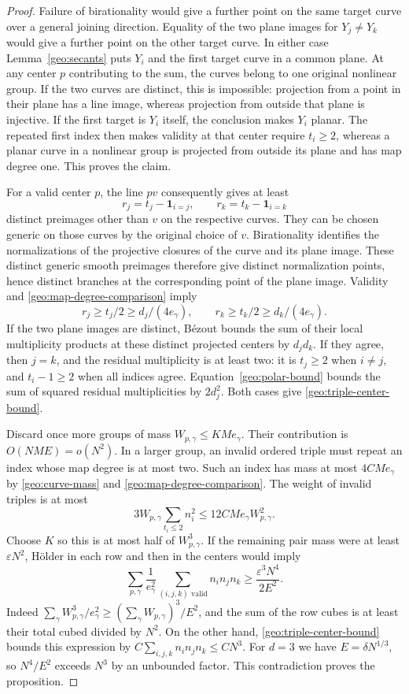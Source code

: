 \begin{proof}
Failure of birationality would give a further point on the same
target curve over a general joining direction. Equality of the two
plane images for $Y_j\ne Y_k$ would give a further point on the
other target curve. In either case Lemma~\ref{geo:secants} puts
$Y_i$ and the first target curve in a common plane. At any center
$p$ contributing to the sum, the curves belong to one original
nonlinear group. If the two curves are distinct, this is impossible:
projection from a point in their plane has
a line image, whereas projection from outside that plane is
injective. If the first target is $Y_i$ itself, the conclusion makes
$Y_i$ planar. The repeated first index then makes validity at that
center require
$t_i\ge2$, whereas a planar curve in a nonlinear group is projected
from outside its plane and has map degree one. This proves the claim.

For a valid center $p$, the line $pv$ consequently gives at least
\[
 r_j=t_j-\mathbf1_{i=j},\qquad
 r_k=t_k-\mathbf1_{i=k}
\]
distinct preimages other than $v$ on the respective curves. They can
be chosen generic on those curves by the original choice of $v$.
Birationality identifies the normalizations of the projective closures
of the curve and its plane image. These distinct generic smooth
preimages therefore give distinct normalization points, hence distinct
branches at the corresponding point of the plane image. Validity and
\eqref{geo:map-degree-comparison} imply
\[
 r_j\ge t_j/2\ge d_j/(4e_\gamma),\qquad
 r_k\ge t_k/2\ge d_k/(4e_\gamma).
\]
If the two plane images are distinct, B\'ezout bounds the sum of their
local multiplicity products at these distinct projected centers by
$d_jd_k$. If they agree, then $j=k$, and the residual multiplicity
is at least two: it is $t_j\ge2$ when $i\ne j$, and $t_i-1\ge2$
when all indices agree. Equation~\eqref{geo:polar-bound} bounds the
sum of squared residual multiplicities by $2d_j^2$.
Both cases give \eqref{geo:triple-center-bound}.

Discard once more groups of mass $W_{p,\gamma}\le KMe_\gamma$.
Their contribution is $O(NME)=o(N^2)$.
In a larger group, an invalid ordered triple must repeat an index
whose map degree is at most two. Such an index has mass at most
$4CMe_\gamma$ by \eqref{geo:curve-mass} and
\eqref{geo:map-degree-comparison}. The weight of invalid triples is
at most
\[
 3W_{p,\gamma}\sum_{t_i\le2}n_i^2
 \le 12CMe_\gamma W_{p,\gamma}^2.
\]
Choose $K$ so this is at most half of $W_{p,\gamma}^3$.
If the remaining pair mass were at least $\varepsilon N^2$, H\"older
in each row and then in the centers would imply
\[
 \sum_{p,\gamma}\frac{1}{e_\gamma^2}
       \sum_{(i,j,k)\text{ valid}}n_i n_j n_k
 \ge \frac{\varepsilon^3N^4}{2E^2}.
\]
Indeed $\sum_\gamma W_{p,\gamma}^3/e_\gamma^2\ge
(\sum_\gamma W_{p,\gamma})^3/E^2$, and the sum of the row cubes is
at least their total cubed divided by $N^2$.
On the other hand, \eqref{geo:triple-center-bound} bounds this expression
by $C\sum_{i,j,k}n_i n_j n_k\le CN^3$.
For $d=3$ we have $E=\delta N^{1/3}$, so $N^4/E^2$ exceeds $N^3$
by an unbounded factor. This contradiction proves the proposition.
\end{proof}
